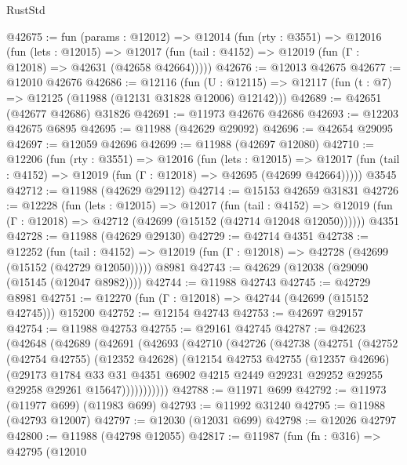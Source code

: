 \begin{lexlean}{RustStd}
\begin{coremodule}
@42675 := fun (params : @12012) =>
  @12014
    (fun (rty : @3551) =>
    @12016
      (fun (lets : @12015) =>
      @12017 (fun (tail : @4152) => @12019 (fun (Γ : @12018) => @42631 (@42658 @42664)))))
@42676 := @12013 @42675
@42677 := @12010 @42676
@42686 := @12116
    (fun (U : @12115) => @12117 (fun (t : @7) => @12125 (@11988 (@12131 @31828 @12006) @12142)))
@42689 := @42651 (@42677 @42686) @31826
@42691 := @11973 @42676 @42686
@42693 := @12203 @42675 @6895
@42695 := @11988 (@42629 @29092)
@42696 := @42654 @29095
@42697 := @12059 @42696
@42699 := @11988 (@42697 @12080)
@42710 := @12206
    (fun (rty : @3551) =>
    @12016
      (fun (lets : @12015) =>
      @12017 (fun (tail : @4152) => @12019 (fun (Γ : @12018) => @42695 (@42699 @42664)))))
    @3545
@42712 := @11988 (@42629 @29112)
@42714 := @15153 @42659 @31831
@42726 := @12228
    (fun (lets : @12015) =>
    @12017
      (fun (tail : @4152) =>
      @12019 (fun (Γ : @12018) => @42712 (@42699 (@15152 (@42714 @12048 @12050))))))
    @4351
@42728 := @11988 (@42629 @29130)
@42729 := @42714 @4351
@42738 := @12252
    (fun (tail : @4152) => @12019 (fun (Γ : @12018) => @42728 (@42699 (@15152 (@42729 @12050)))))
    @8981
@42743 := @42629 (@12038 (@29090 (@15145 (@12047 @8982))))
@42744 := @11988 @42743
@42745 := @42729 @8981
@42751 := @12270 (fun (Γ : @12018) => @42744 (@42699 (@15152 @42745))) @15200
@42752 := @12154 @42743
@42753 := @42697 @29157
@42754 := @11988 @42753
@42755 := @29161 @42745
@42787 := @42623
    (@42648
      (@42689
        (@42691
          (@42693
            (@42710
              (@42726
                (@42738
                  (@42751
                    (@42752
                      (@42754 @42755)
                      (@12352 @42628)
                      (@12154
                        @42753
                        @42755
                        (@12357 @42696)
                        (@29173
                          @1784
                          @33
                          @31
                          @4351
                          @6902
                          @4215
                          @2449
                          @29231
                          @29252
                          @29255
                          @29258
                          @29261
                          @15647)))))))))))
@42788 := @11971 @699
@42792 := @11973 (@11977 @699) (@11983 @699)
@42793 := @11992 @31240
@42795 := @11988 (@42793 @12007)
@42797 := @12030 (@12031 @699)
@42798 := @12026 @42797
@42800 := @11988 (@42798 @12055)
@42817 := @11987
    (fun (fn : @316) =>
    @42795
      (@12010

\end{coremodule}
\end{lexlean}
